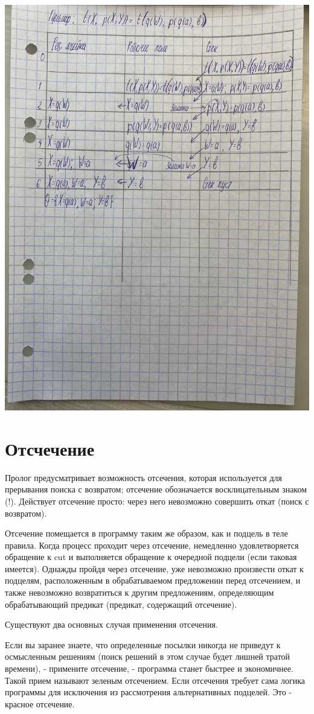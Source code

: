 \documentclass[12pt]{report}
\begin{document}
\includegraphics[width=\linewidth]{img/example}


\section{Отсчечение}

Пролог предусматривает возможность отсечения, которая используется для прерывания поиска с возвратом; отсечение обозначается восклицательным знаком (!). Действует отсечение просто: через него невозможно совершить откат (поиск с возвратом).

Отсечение помещается в программу таким же образом, как и подцель в теле правила. Когда процесс проходит через отсечение, немедленно удовлетворяется обращение к cut и выполняется обращение к очередной подцели (если таковая имеется). Однажды пройдя через отсечение, уже невозможно произвести откат к подцелям, расположенным в обрабатываемом предложении перед отсечением, и также невозможно возвратиться к другим предложениям, определяющим обрабатывающий предикат (предикат, содержащий отсечение).

Существуют два основных случая применения отсечения.

Если вы заранее знаете, что определенные посылки никогда не приведут к осмысленным решениям (поиск решений в этом случае будет лишней тратой времени), - примените отсечение, - программа станет быстрее и экономичнее. Такой прием называют зеленым отсечением.
Если отсечения требует сама логика программы для исключения из рассмотрения альтернативных подцелей. Это - красное отсечение.
\end{document}
